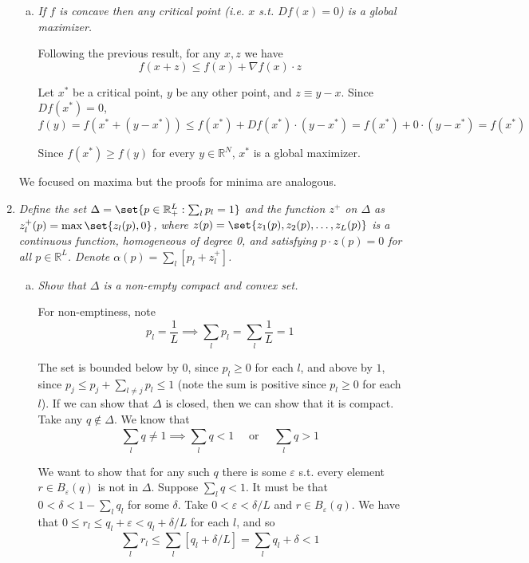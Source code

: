 \documentclass{article}
\begin{document}
\begin{enumerate}[1.]
\begin{enumerate}[a)]
      \item \textit{If $f$ is concave then any critical point (i.e. $x$ s.t. $Df(x) = 0$) is a global maximizer.}

        \solution Following the previous result, for any $x, z$ we have
        \[
          f(x + z) \le f(x) + \nabla f(x) \cdot z
        \]

        Let $x^*$ be a critical point, $y$ be any other point, and $z \equiv y - x$. Since $D f(x^*) = 0$,
        \[
          f(y)
          =
          f(x^* + (y - x^*))
          \le f(x^*) + D f(x^*) \cdot (y - x^*)
          = f(x^*) + 0 \cdot (y - x^*)
          = f(x^*)
        \]

        Since $f(x^*) \ge f(y)$ for every $y \in \mathbb{R}^N$, $x^*$ is a global maximizer.
    \end{enumerate}

    \begin{remark}
      We focused on maxima but the proofs for minima are analogous.
    \end{remark}

  \item {\itshape
    Define the set $\Delta = \set{p \in \mathbb{R}^L_{+}: \sum^{}_{l} p_l = 1}$ and the function $z^+$ on $\Delta$ as $z^+_l(p) = \max\set{z_l(p), 0}$, where $z(p) = \set{z_1(p), z_2(p), \ldots, z_L(p)}$ is a continuous function, homogeneous of degree 0, and satisfying $p \cdot z(p) = 0$ for all $p \in \mathbb{R}^L$. Denote $\alpha(p) = \sum^{}_{l} \left[p_l + z_l^+\right]$.}

    \begin{enumerate}[a)]
      \item \textit{Show that $\Delta$ is a non-empty compact and convex set.}

        \solution For non-emptiness, note
        \[
          p_l = \dfrac{1}{L}
          \implies
          \sum_l p_l = \sum^{}_{l} \dfrac{1}{L} = 1
        \]

        The set is bounded below by $0$, since $p_l \ge 0$ for each $l$, and above by $1$, since $p_j \le p_j + \sum^{}_{l \ne j} p_l \le 1$ (note the sum is positive since $p_l \ge 0$ for each $l$). If we can show that $\Delta$ is closed, then we can show that it is compact. Take any $q \notin \Delta$. We know that
        \[
          \sum^{}_{l} q \ne 1
          \implies
          \sum^{}_{l} q < 1
          \quad
          \text{ or }
          \quad
          \sum^{}_{l} q > 1
        \]

        We want to show that for any such $q$ there is some $\varepsilon$ s.t. every element $r \in B_{\varepsilon}(q)$ is not in $\Delta$. Suppose $\sum^{}_{l} q < 1$.  It must be that $0 < \delta < 1 - \sum^{}_{l} q_l$ for some $\delta$. Take $0 < \varepsilon < \delta / L$ and $r \in B_{\varepsilon}(q)$. We have that $0 \le r_l \le q_l + \varepsilon < q_l + \delta / L$ for each $l$, and so
        \[
          \sum^{}_{l} r_l \le \sum^{}_{l}  \left[q_l + \delta / L\right] = \sum^{}_{l}  q_l + \delta < 1
        \]


\end{enumerate}
\end{enumerate}
\end{document}
